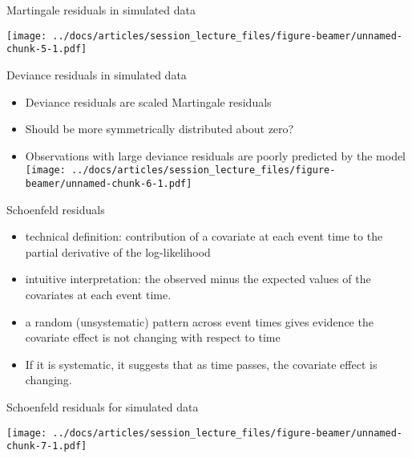 \documentclass[
  ignorenonframetext,
]{beamer}
\providecommand{\tightlist}{%
  \setlength{\itemsep}{0pt}\setlength{\parskip}{0pt}}
\begin{document}
\begin{frame}{Martingale residuals in simulated data}
\protect\hypertarget{martingale-residuals-in-simulated-data}{}

\texttt{[image: ../docs/articles/session\_lecture\_files/figure-beamer/unnamed-chunk-5-1.pdf]}

\end{frame}

\begin{frame}{Deviance residuals in simulated data}
\protect\hypertarget{deviance-residuals-in-simulated-data}{}

\begin{itemize}
\tightlist
\item
  Deviance residuals are scaled Martingale residuals
\item
  Should be more symmetrically distributed about zero?
\item
  Observations with large deviance residuals are poorly predicted by the
  model
  \texttt{[image: ../docs/articles/session\_lecture\_files/figure-beamer/unnamed-chunk-6-1.pdf]}
\end{itemize}

\end{frame}

\begin{frame}{Schoenfeld residuals}
\protect\hypertarget{schoenfeld-residuals}{}

\begin{itemize}
\tightlist
\item
  technical definition: contribution of a covariate at each event time
  to the partial derivative of the log-likelihood
\item
  intuitive interpretation: the observed minus the expected values of
  the covariates at each event time.
\item
  a random (unsystematic) pattern across event times gives evidence the
  covariate effect is not changing with respect to time
\item
  If it is systematic, it suggests that as time passes, the covariate
  effect is changing.
\end{itemize}

\end{frame}

\begin{frame}{Schoenfeld residuals for simulated data}
\protect\hypertarget{schoenfeld-residuals-for-simulated-data}{}

\texttt{[image: ../docs/articles/session\_lecture\_files/figure-beamer/unnamed-chunk-7-1.pdf]}

\end{frame}
\end{document}
